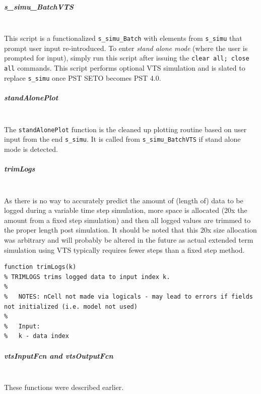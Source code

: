 \documentclass[12pt]{article}
\begin{document}
\subparagraph{s\_simu\_BatchVTS} \ \\
This script is a functionalized \verb|s_simu_Batch| with elements from \verb|s_simu| that prompt user input re-introduced.
To enter \emph{stand alone mode} (where the user is prompted for input), simply run this script after issuing the \verb|clear all; close all| commands.
This script performs optional VTS simulation and is slated to replace \verb|s_simu| once PST SETO becomes PST 4.0.

\subparagraph{standAlonePlot} \ \\
The \verb|standAlonePlot| function is the cleaned up plotting routine based on user input from the end \verb|s_simu|.
It is called from \verb|s_simu_BatchVTS| if stand alone mode is detected.

\subparagraph{trimLogs} \ \\
As there is no way to accurately predict the amount of (length of) data to be logged during a variable time step simulation, more space is allocated (20x the amount from a fixed step simulation) and then all logged values are trimmed to the proper length post simulation.
It should be noted that this 20x size allocation was arbitrary and will probably be altered in the future as actual extended term simulation using VTS typically requires fewer steps than a fixed step method.

\begin{verbatim}
function trimLogs(k)
% TRIMLOGS trims logged data to input index k.
%
%   NOTES: nCell not made via logicals - may lead to errors if fields not initialized (i.e. model not used)
%
%   Input:
%   k - data index
\end{verbatim} 

\subparagraph{vtsInputFcn and vtsOutputFcn} \ \\
These functions were described earlier.

\end{document}
